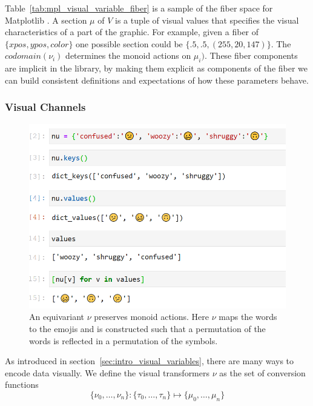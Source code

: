 \documentclass[../main.tex]{subfiles}
\begin{document}
Table~\ref{tab:mpl_visual_variable_fiber} is a sample of the fiber space for Matplotlib \cite{hunterMatplotlib2DGraphics2007}. A section $\mu$ of $V$ is a tuple of visual values that specifies the visual characteristics of a part of the graphic. For example, given a fiber of $\{xpos, ypos, color\}$ one possible section could be  $\{.5, .5, (255, 20,147)\}$. The $codomain(\nu_i)$ determines the monoid actions on $\mu_i)$. These fiber components are implicit in the library, by making them explicit as components of the fiber we can build consistent definitions and expectations of how these parameters behave. 

\subsubsection{Visual Channels}
\label{sec:artist_nu}
\begin{figure}[H]
    \includegraphics[width=\textwidth]{figures/math/equivariance_nu.png}
    \caption{An equivariant $\nu$ preserves monoid actions. Here $\nu$ maps the words to the emojis and is constructed such that a permutation of the words is reflected in a permutation of the symbols. }
    \label{fig:artist_nu}
\end{figure}
As introduced in section~\ref{sec:intro_visual_variables}, there are many ways to encode data visually. We define the visual transformers $\nu$ as the set of conversion functions 
\begin{equation}
    \label{eq:nu_expanded}
    \{\nu_{0}, \ldots, \nu_{n}\}: \{\tau_{0}, \ldots, \tau_{n}\} \mapsto \{\mu_{0}, \ldots, \mu_{n}\}
\end{equation}
\end{document}
